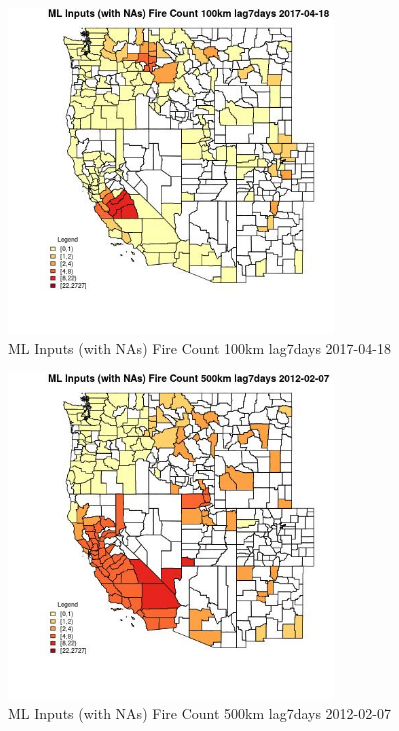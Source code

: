 \begin{figure} 
\centering  
\includegraphics[width=0.77\textwidth]{Code_Outputs/Report_ML_input_PM25_Step4_part_f_de_duplicated_aveswNAs_CountyFire_Count_100km_lag7daysMean2017-04-18.jpg} 
\caption{\label{fig:Report_ML_input_PM25_Step4_part_f_de_duplicated_aveswNAsCountyFire_Count_100km_lag7daysMean2017-04-18}ML Inputs (with NAs) Fire Count 100km lag7days 2017-04-18} 
\end{figure} 
 

\begin{figure} 
\centering  
\includegraphics[width=0.77\textwidth]{Code_Outputs/Report_ML_input_PM25_Step4_part_f_de_duplicated_aveswNAs_CountyFire_Count_500km_lag7daysMean2012-02-07.jpg} 
\caption{\label{fig:Report_ML_input_PM25_Step4_part_f_de_duplicated_aveswNAsCountyFire_Count_500km_lag7daysMean2012-02-07}ML Inputs (with NAs) Fire Count 500km lag7days 2012-02-07} 
\end{figure} 
 

